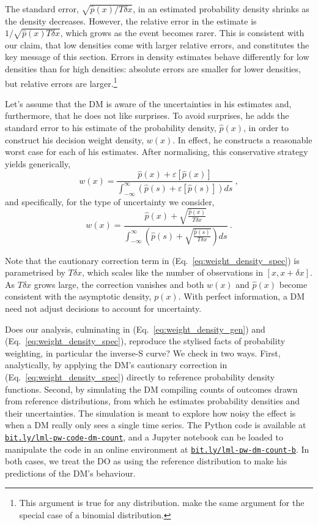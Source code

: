 \documentclass[a4paper, 12pt]{article}
\newcommand{\elabel}[1]{\label{eq:#1}}
\newcommand{\eref}[1]{(Eq.~\ref{eq:#1})}
\newcommand{\be}{\begin{equation}}
\newcommand{\ee}{\end{equation}}
\newcommand{\err}[1]{\varepsilon\left[#1\right]}
\newcommand{\phat}{\hat{p}}
\begin{document}
The standard error, $ \sqrt{\phat(x)/T \delta x}$, in an estimated probability density shrinks as the density decreases. However, the relative error in the estimate is $1/\sqrt{\phat(x)T\delta x}$, which grows as the event becomes rarer. This is consistent with our claim, that low densities come with larger relative errors, and constitutes the key message of this section. Errors in density estimates behave differently for low densities than for high densities: absolute errors are smaller for lower densities, but relative errors are larger.\footnote{This argument is true for any distribution. \textcite[537-8]{HertwigETAL2004} make the same argument for the special case of a binomial distribution.}

Let's assume that the DM is aware of the uncertainties in his estimates and, furthermore, that he does not like surprises. To avoid surprises, he adds the standard error to his estimate of the probability density, $\phat(x)$, in order to construct his decision weight density, $w(x)$. In effect, he constructs a reasonable worst case for each of his estimates. After normalising, this conservative strategy yields generically,
\be
w(x) = \frac{\phat(x)+\err{\phat(x)}}{\int_{-\infty}^{\infty}\left(\phat(s)+\err{\phat(s)}\right)ds}~,
\elabel{weight_density_gen}
\ee
and specifically, for the type of uncertainty we consider,
\be
w(x)= \frac{\phat(x)+\sqrt{\frac{\phat(x)}{T \delta x}}}{\int_{-\infty}^{\infty}\left(\phat(s)+\sqrt{\frac{\phat(s)}{T \delta x}}\right)ds}~.
\elabel{weight_density_spec}
\ee

Note that the cautionary correction term in \eref{weight_density_spec} is parametrised by $T\delta x$, which scales like the number of observations in $[x, x+\delta x]$. As $T\delta x$ grows large, the correction vanishes and both $w(x)$ and $\phat(x)$ become consistent with the asymptotic density, $p(x)$. With perfect information, a DM need not adjust decisions to account for uncertainty.

Does our analysis, culminating in \eref{weight_density_gen} and \eref{weight_density_spec}, reproduce the stylised facts of probability weighting, in particular the inverse-S curve? We check in two ways. First, analytically, by applying the DM's cautionary correction in \eref{weight_density_spec} directly to reference probability density functions. Second, by simulating the DM compiling counts of outcomes drawn from reference distributions, from which he estimates probability densities and their uncertainties. The simulation is meant to explore how noisy the effect is when a DM really only sees a single time series. The Python code is available at \href{https://bit.ly/lml-pw-code-dm-count}{\texttt{bit.ly/lml-pw-code-dm-count}}, and a Jupyter notebook can be loaded to manipulate the code in an online environment at \href{https://bit.ly/lml-pw-dm-count-b}{\texttt{bit.ly/lml-pw-dm-count-b}}. In both cases, we treat the DO as using the reference distribution to make his predictions of the DM's behaviour.
\end{document}
